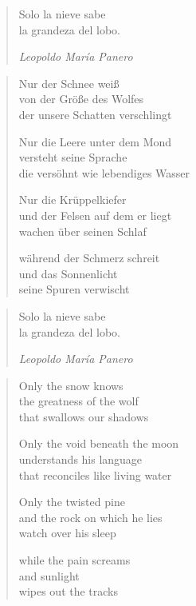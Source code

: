 
\cleartoverso


\begin{quote}
Solo la nieve sabe\\
la grandeza del lobo.

\hspace{2em}\textit{Leopoldo María Panero}
\end{quote}

\begin{verse}
Nur der Schnee weiß\\
von der Größe des Wolfes\\
der unsere Schatten verschlingt

Nur die Leere unter dem Mond\\
versteht seine Sprache\\
die versöhnt wie lebendiges Wasser

Nur die Krüppelkiefer\\
und der Felsen auf dem er liegt\\
wachen über seinen Schlaf

während der Schmerz schreit\\
und das Sonnenlicht\\
seine Spuren verwischt
\end{verse}

\cleartorecto


\begin{quote}
Solo la nieve sabe\\
la grandeza del lobo.

\hspace{2em}\textit{Leopoldo María Panero}
\end{quote}

\begin{verse}
Only the snow knows\\
the greatness of the wolf\\
that swallows our shadows

Only the void beneath the moon\\
understands his language\\
that reconciles like living water

Only the twisted pine\\
and the rock on which he lies\\
watch over his sleep

while the pain screams\\
and sunlight\\
wipes out the tracks
\end{verse}
